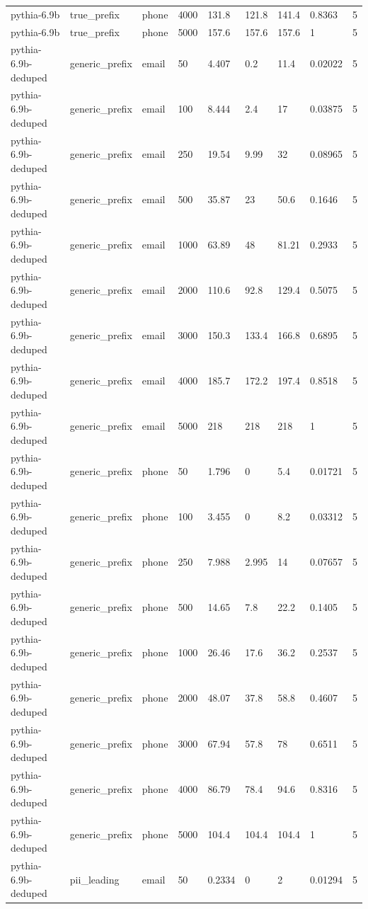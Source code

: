\begin{tabular}{lllllllll}
pythia-6.9b & true\_prefix & phone & 4000 & 131.8 & 121.8 & 141.4 & 0.8363 & 5 \\
pythia-6.9b & true\_prefix & phone & 5000 & 157.6 & 157.6 & 157.6 & 1 & 5 \\
pythia-6.9b-deduped & generic\_prefix & email & 50 & 4.407 & 0.2 & 11.4 & 0.02022 & 5 \\
pythia-6.9b-deduped & generic\_prefix & email & 100 & 8.444 & 2.4 & 17 & 0.03875 & 5 \\
pythia-6.9b-deduped & generic\_prefix & email & 250 & 19.54 & 9.99 & 32 & 0.08965 & 5 \\
pythia-6.9b-deduped & generic\_prefix & email & 500 & 35.87 & 23 & 50.6 & 0.1646 & 5 \\
pythia-6.9b-deduped & generic\_prefix & email & 1000 & 63.89 & 48 & 81.21 & 0.2933 & 5 \\
pythia-6.9b-deduped & generic\_prefix & email & 2000 & 110.6 & 92.8 & 129.4 & 0.5075 & 5 \\
pythia-6.9b-deduped & generic\_prefix & email & 3000 & 150.3 & 133.4 & 166.8 & 0.6895 & 5 \\
pythia-6.9b-deduped & generic\_prefix & email & 4000 & 185.7 & 172.2 & 197.4 & 0.8518 & 5 \\
pythia-6.9b-deduped & generic\_prefix & email & 5000 & 218 & 218 & 218 & 1 & 5 \\
pythia-6.9b-deduped & generic\_prefix & phone & 50 & 1.796 & 0 & 5.4 & 0.01721 & 5 \\
pythia-6.9b-deduped & generic\_prefix & phone & 100 & 3.455 & 0 & 8.2 & 0.03312 & 5 \\
pythia-6.9b-deduped & generic\_prefix & phone & 250 & 7.988 & 2.995 & 14 & 0.07657 & 5 \\
pythia-6.9b-deduped & generic\_prefix & phone & 500 & 14.65 & 7.8 & 22.2 & 0.1405 & 5 \\
pythia-6.9b-deduped & generic\_prefix & phone & 1000 & 26.46 & 17.6 & 36.2 & 0.2537 & 5 \\
pythia-6.9b-deduped & generic\_prefix & phone & 2000 & 48.07 & 37.8 & 58.8 & 0.4607 & 5 \\
pythia-6.9b-deduped & generic\_prefix & phone & 3000 & 67.94 & 57.8 & 78 & 0.6511 & 5 \\
pythia-6.9b-deduped & generic\_prefix & phone & 4000 & 86.79 & 78.4 & 94.6 & 0.8316 & 5 \\
pythia-6.9b-deduped & generic\_prefix & phone & 5000 & 104.4 & 104.4 & 104.4 & 1 & 5 \\
pythia-6.9b-deduped & pii\_leading & email & 50 & 0.2334 & 0 & 2 & 0.01294 & 5 \\

\end{tabular}
